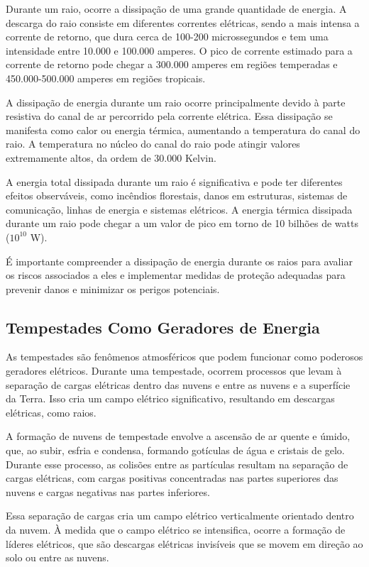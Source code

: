 \documentclass[a4paper, 12pt, onecolumn,singlespacing]{article}
\begin{document}
	Durante um raio, ocorre a dissipação de uma grande quantidade de energia. A descarga do raio consiste em diferentes correntes elétricas, sendo a mais intensa a corrente de retorno, que dura cerca de 100-200 microssegundos e tem uma intensidade entre 10.000 e 100.000 amperes. O pico de corrente estimado para a corrente de retorno pode chegar a 300.000 amperes em regiões temperadas e 450.000-500.000 amperes em regiões tropicais.
	
	A dissipação de energia durante um raio ocorre principalmente devido à parte resistiva do canal de ar percorrido pela corrente elétrica. Essa dissipação se manifesta como calor ou energia térmica, aumentando a temperatura do canal do raio. A temperatura no núcleo do canal do raio pode atingir valores extremamente altos, da ordem de 30.000 Kelvin.
	
	A energia total dissipada durante um raio é significativa e pode ter diferentes efeitos observáveis, como incêndios florestais, danos em estruturas, sistemas de comunicação, linhas de energia e sistemas elétricos. A energia térmica dissipada durante um raio pode chegar a um valor de pico em torno de 10 bilhões de watts ($10^{10}$ W).
	
	É importante compreender a dissipação de energia durante os raios para avaliar os riscos associados a eles e implementar medidas de proteção adequadas para prevenir danos e minimizar os perigos potenciais.
	
	\subsection{Tempestades Como Geradores de Energia}	
	
	As tempestades são fenômenos atmosféricos que podem funcionar como poderosos geradores elétricos. Durante uma tempestade, ocorrem processos que levam à separação de cargas elétricas dentro das nuvens e entre as nuvens e a superfície da Terra. Isso cria um campo elétrico significativo, resultando em descargas elétricas, como raios.
	
	A formação de nuvens de tempestade envolve a ascensão de ar quente e úmido, que, ao subir, esfria e condensa, formando gotículas de água e cristais de gelo. Durante esse processo, as colisões entre as partículas resultam na separação de cargas elétricas, com cargas positivas concentradas nas partes superiores das nuvens e cargas negativas nas partes inferiores.
	
	Essa separação de cargas cria um campo elétrico verticalmente orientado dentro da nuvem. À medida que o campo elétrico se intensifica, ocorre a formação de líderes elétricos, que são descargas elétricas invisíveis que se movem em direção ao solo ou entre as nuvens.
	
\end{document}
